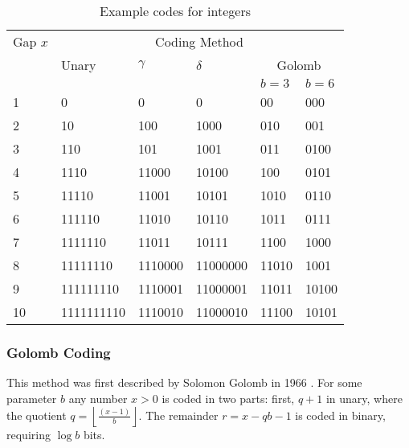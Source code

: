 \begin{table}[htbp]
  \begin{center}
    \begin{tabular}{llllll}
      Gap $x$ & \multicolumn{5}{c}{Coding Method} \\
      \cline{2-6} 
            & Unary & $\gamma$  & $\delta$ & \multicolumn{2}{c}{Golomb} \\
            \cline{5-6}
            &       &           &          &  $b = 3$ & $b = 6$  \\
      \hline
        1       &       0               &       0       &       0               &       00      &       000 \\
        2       &       10              &       100     &       1000            &       010     &       001 \\
        3       &       110             &       101     &       1001            &       011     &       0100 \\
        4       &       1110            &       11000   &       10100           &       100     &       0101 \\
        5       &       11110           &       11001   &       10101           &       1010    &       0110 \\
        6       &       111110          &       11010   &       10110           &       1011    &       0111 \\
        7       &       1111110         &       11011   &       10111           &       1100    &       1000 \\
        8       &       11111110        &       1110000 &       11000000        &       11010   &       1001 \\
        9       &       111111110       &       1110001 &       11000001        &       11011   &       10100 \\
        10      &       1111111110      &       1110010 &       11000010        &       11100   &       10101 \\
    \end{tabular}
    \caption{Example codes for integers}
    \label{tab:codes}
  \end{center}
\end{table}

\subsubsection{Golomb Coding}
This method was first described by Solomon Golomb in 1966 \cite{golomb66}.  For some parameter $b$ any number $x > 0$ is coded in two parts: first, $q + 1$ in unary, where the quotient $q = \left\lfloor \frac{(x - 1)}{b}\right\rfloor$.  The remainder $r = x - qb - 1$ is coded in binary, requiring $\log b$ bits.

